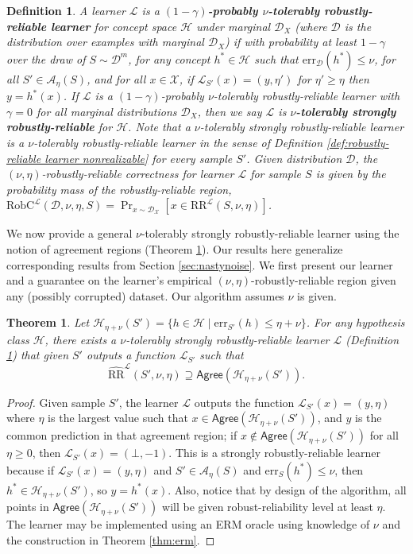 \documentclass[11pt]{article}
\newcommand{\CR}{\text{RR}}
\newcommand{\ECR}{\widehat{\text{RR}}}
\newcommand{\err}{\mathrm{err}}
\newtheorem{theorem}{Theorem}[section]
\newtheorem{definition}{Definition}
\newcommand{\0}{\mathbf{0}}
\newcommand{\1}{\mathbf{1}}
\newcommand{\cA}{\mathcal{A}}
\newcommand{\cD}{\mathcal{D}}
\newcommand{\cH}{\mathcal{H}}
\newcommand{\cL}{\mathcal{L}}
\newcommand{\cX}{\mathcal{X}}
\newcommand{\Agree}{\mathsf{Agree}}
\begin{document}
{\begin{definition}
A learner $\cL$ is a {\bf $(1-\gamma)$-probably $\nu$-tolerably  robustly-reliable learner} for concept space $\cH$
under marginal $\cD_X$ (where $\cD$ is the distribution over examples with marginal $\cD_X$)
if with probability at least $1-\gamma$ over the draw of $S\sim\cD^m$, for any concept $h^*\in\cH$ such that $\err_\cD(h^*)\le\nu$,
for all $S'\in\cA_\eta(S)$, and for all $x\in\cX$, if $\cL_{S'}(x)=(y,\eta')$ for $\eta'\geq \eta$ then $y= h^*(x)$.
If $\cL$ is a $(1-\gamma)$-probably $\nu$-tolerably  robustly-reliable learner with $\gamma=0$ for all marginal distributions $\cD_X$, then we say
$\cL$ is {\bf $\nu$-tolerably  strongly robustly-reliable} for $\cH$. Note that
a $\nu$-tolerably strongly robustly-reliable learner is a $\nu$-tolerably robustly-reliable learner in the sense of Definition \ref{def:robustly-reliable learner nonrealizable} for every sample $S'$.
Given distribution $\cD$, the $(\nu,\eta)$-robustly-reliable correctness for learner $\cL$ for sample $S$ is given by the probability mass of the robustly-reliable region, $\text{RobC}^\cL(\cD,\nu,\eta,S)=\Pr_{x\sim\cD_\cX}[x\in\CR^\cL(S,\nu,\eta)]$.


\label{def:probably robustly-reliable learner nonrealizable}
\end{definition}


}

We now provide a general $\nu$-tolerably  strongly robustly-reliable learner using the notion of agreement regions (Theorem \ref{thm:empirical-ub-nr}).  Our results here generalize corresponding results from Section \ref{sec:nastynoise}. We first present our learner and a guarantee on the learner's empirical $(\nu,\eta)$-robustly-reliable region given any (possibly corrupted) dataset.
Our algorithm assumes $\nu$ is given.

\begin{theorem}\label{thm:empirical-ub-nr}
{Let $\cH_{\eta+\nu}(S')=\{h \in \cH\mid \err_{S'}(h)\le\eta+\nu\}$.} For any hypothesis class $\cH$, there exists a $\nu$-tolerably strongly robustly-reliable learner $\cL$ (Definition \ref{def:probably robustly-reliable learner nonrealizable}) that given $S'$ outputs a function $\cL_{S'}$ such that $$\ECR^{\cL}(S',\nu,\eta) \supseteq \Agree(\cH_{\eta+\nu}(S')).$$%
\end{theorem}
\begin{proof}
Given sample $S'$, the learner $\cL$ outputs the function $\cL_{S'}(x) =(y,\eta)$ where $\eta$ is the largest value such that $x \in \Agree(\cH_{\eta+\nu}(S'))$, and $y$ is the common prediction in that agreement region; if  $x \not\in \Agree(\cH_{\eta+\nu}(S'))$ for all $\eta\geq 0$, then $\cL_{S'}(x) =(\bot,-1)$. This is a strongly robustly-reliable learner because if $\cL_{S'}(x) =(y,\eta)$ and $S' \in \cA_\eta(S)$ and $\err_S(h^*)\le\nu$, then $h^* \in \cH_{\eta+\nu}(S')$, so $y=h^*(x)$. Also, notice that by design of the algorithm, all points in $\Agree(\cH_{\eta+\nu}(S'))$ will be given robust-reliability level at least $\eta$. The learner may be implemented using an ERM oracle using knowledge of $\nu$ and the construction in Theorem \ref{thm:erm}.
\end{proof}
\end{document}
